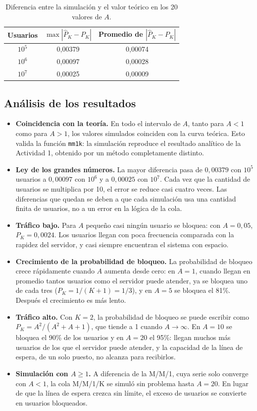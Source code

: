 \documentclass[12pt]{article}
\begin{document}
\begin{table}[!htbp]
\centering
\begin{tabular}{c c c}
\hline
Usuarios & $\max\left|\hat{P}_K-P_K\right|$ & Promedio de $\left|\hat{P}_K-P_K\right|$ \\
\hline
$10^5$ & 0,00379 & 0,00074 \\
$10^6$ & 0,00097 & 0,00028 \\
$10^7$ & 0,00025 & 0,00009 \\
\hline
\end{tabular}
\caption{Diferencia entre la simulación y el valor teórico en los 20 valores de $A$.}
\label{tab:errores}
\end{table}

\subsection{Análisis de los resultados}

\begin{itemize}
    \item \textbf{Coincidencia con la teoría.} En todo el intervalo de $A$, tanto para $A<1$ como para $A>1$, los valores simulados coinciden con la curva teórica. Esto valida la función \texttt{mm1k}: la simulación reproduce el resultado analítico de la Actividad 1, obtenido por un método completamente distinto.
    \item \textbf{Ley de los grandes números.} La mayor diferencia pasa de $0{,}00379$ con $10^5$ usuarios a $0{,}00097$ con $10^6$ y a $0{,}00025$ con $10^7$. Cada vez que la cantidad de usuarios se multiplica por 10, el error se reduce casi cuatro veces. Las diferencias que quedan se deben a que cada simulación usa una cantidad finita de usuarios, no a un error en la lógica de la cola.
    \item \textbf{Tráfico bajo.} Para $A$ pequeño casi ningún usuario se bloquea: con $A=0{,}05$, $P_K=0{,}0024$. Los usuarios llegan con poca frecuencia comparada con la rapidez del servidor, y casi siempre encuentran el sistema con espacio.
    \item \textbf{Crecimiento de la probabilidad de bloqueo.} La probabilidad de bloqueo crece rápidamente cuando $A$ aumenta desde cero: en $A=1$, cuando llegan en promedio tantos usuarios como el servidor puede atender, ya se bloquea uno de cada tres ($P_K=1/(K+1)=1/3$), y en $A=5$ se bloquea el 81\%. Después el crecimiento es más lento.
    \item \textbf{Tráfico alto.} Con $K=2$, la probabilidad de bloqueo se puede escribir como $P_K=A^2/(A^2+A+1)$, que tiende a 1 cuando $A\to\infty$. En $A=10$ se bloquea el 90\% de los usuarios y en $A=20$ el 95\%: llegan muchos más usuarios de los que el servidor puede atender, y la capacidad de la línea de espera, de un solo puesto, no alcanza para recibirlos.
    \item \textbf{Simulación con $A\geq1$.} A diferencia de la M/M/1, cuya serie solo converge con $A<1$, la cola M/M/1/K se simuló sin problema hasta $A=20$. En lugar de que la línea de espera crezca sin límite, el exceso de usuarios se convierte en usuarios bloqueados.
\end{itemize}
\end{document}
